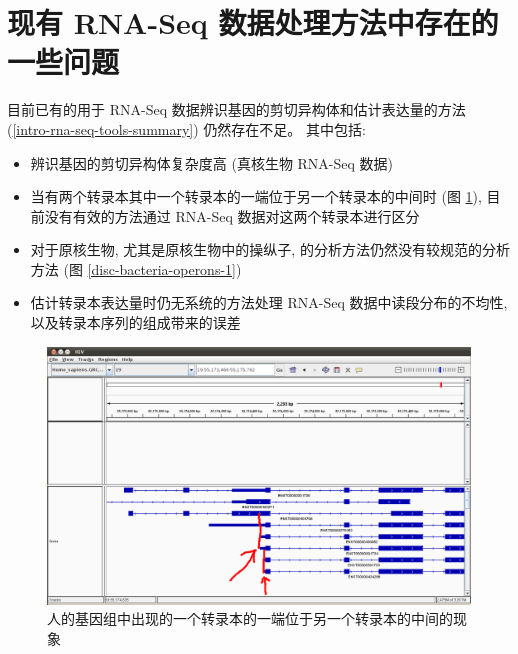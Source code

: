 \section{现有 RNA-Seq 数据处理方法中存在的一些问题}
目前已有的用于 RNA-Seq 数据辨识基因的剪切异构体和估计表达量的方法 
(\ref{intro-rna-seq-tools-summary}) 仍然存在不足。 
其中包括: 
\begin{itemize}
\item 辨识基因的剪切异构体复杂度高 (真核生物 RNA-Seq 数据)

\item 当有两个转录本其中一个转录本的一端位于另一个转录本的中间时 
(图 \ref{disc-human-gene-alternative-start-1}), 
目前没有有效的方法通过 RNA-Seq 数据对这两个转录本进行区分

\item 对于原核生物, 尤其是原核生物中的操纵子, 的分析方法仍然没有较规范的分析方法 
\cite{mcclure2013computational} (图 \ref{disc-bacteria-operons-1})

\item 估计转录本表达量时仍无系统的方法处理 RNA-Seq 数据中读段分布的不均性, 
以及转录本序列的组成带来的误差 \cite{oshlack2009transcript, jones2012new} 
\end{itemize}

\begin{figure}[!t]
\centering
\includegraphics[width=\textwidth]{figures/disc/disc-human-gene-alternative-start-1.png}
\caption{人的基因组中出现的一个转录本的一端位于另一个转录本的中间的现象}
\label{disc-human-gene-alternative-start-1}
\end{figure}

